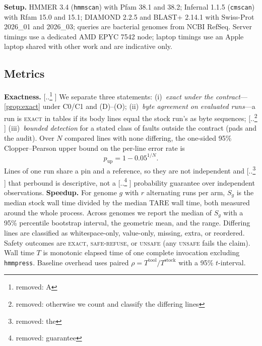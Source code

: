 \documentclass[letterpaper,twocolumn,10pt]{article}
\theoremstyle{definition}
\newcommand{\sys}{TARE\xspace}
\newcommand{\sys}{PARE\xspace}
\newcommand{\dec}[1]{\textsc{#1}}
\providecommand{\DIFadd}[1]{{\protect\color{blue} \sf #1}} %
\providecommand{\DIFdel}[1]{{\protect\color{red} [..\footnote{removed: #1} ]}} %
\providecommand{\DIFaddbegin}{} %
\providecommand{\DIFaddend}{} %
\providecommand{\DIFdelbegin}{} %
\providecommand{\DIFdelend}{} %
\providecommand{\DIFscaledelfig}{0.5}
\newlength{\DIFdelgraphicswidth} %
\newlength{\DIFdelgraphicsheight} %
\providecommand{\DIFaddincludegraphics}[2][]{{\color{blue}\fbox{\DIFOincludegraphics[#1]{#2}}}} %
\providecommand{\DIFdelincludegraphics}[2][]{%
\sbox{\DIFdelgraphicsbox}{\DIFOincludegraphics[#1]{#2}}%
\settoboxwidth{\DIFdelgraphicswidth}{\DIFdelgraphicsbox} %
\settoboxtotalheight{\DIFdelgraphicsheight}{\DIFdelgraphicsbox} %
\scalebox{\DIFscaledelfig}{%
\parbox[b]{\DIFdelgraphicswidth}{\usebox{\DIFdelgraphicsbox}\\[-\baselineskip] \rule{\DIFdelgraphicswidth}{0em}}\llap{\resizebox{\DIFdelgraphicswidth}{\DIFdelgraphicsheight}{%
\setlength{\unitlength}{\DIFdelgraphicswidth}%
\begin{picture}(1,1)%
\thicklines\linethickness{2pt} %
{\color[rgb]{1,0,0}\put(0,0){\framebox(1,1){}}}%
{\color[rgb]{1,0,0}\put(0,0){\line( 1,1){1}}}%
{\color[rgb]{1,0,0}\put(0,1){\line(1,-1){1}}}%
\end{picture}%
}\hspace*{3pt}}} %
} %
\DeclareRobustCommand{\DIFaddbegin}{\DIFOaddbegin \let\includegraphics\DIFaddincludegraphics} %
\DeclareRobustCommand{\DIFaddend}{\DIFOaddend \let\includegraphics\DIFOincludegraphics} %
\DeclareRobustCommand{\DIFdelbegin}{\DIFOdelbegin \let\includegraphics\DIFdelincludegraphics} %
\DeclareRobustCommand{\DIFdelend}{\DIFOaddend \let\includegraphics\DIFOincludegraphics} %
\begin{document}
\textbf{Setup.} HMMER 3.4 (\texttt{hmmscan}) with Pfam 38.1 and 38.2; Infernal 1.1.5 (\texttt{cmscan}) with Rfam 15.0
and 15.1; DIAMOND 2.2.5 and BLAST+ 2.14.1 with Swiss\nobreakdash-Prot 2026\_01 and 2026\_03; queries are bacterial genomes from NCBI
RefSeq. Server timings use a dedicated AMD EPYC 7542 node; laptop timings use an Apple laptop shared with other work and
are indicative only.

\subsection{Metrics}
\label{sec:metrics}

\textbf{Exactness.} \DIFdelbegin \DIFdel{A }\DIFdelend \DIFaddbegin \DIFadd{We separate three statements: (i)~\emph{exact under the contract}---\cref{prop:exact} under C0/C1 and
(D)--(O); (ii)~\emph{byte agreement on evaluated runs}---a }\DIFaddend run is \dec{exact} \DIFaddbegin \DIFadd{in tables }\DIFaddend if its body lines equal the stock
run's as byte sequences; \DIFdelbegin \DIFdel{otherwise we count
and classify the
differing lines}\DIFdelend \DIFaddbegin \DIFadd{(iii)~\emph{bounded detection} for a stated class of faults outside the contract (pads and the
audit)}\DIFaddend . Over $N$ compared lines with none differing, the one\nobreakdash-sided 95\% Clopper--Pearson upper
bound on the per\nobreakdash-line error rate is
\begin{equation}
p_{\text{up}} = 1 - 0.05^{1/N}.
\label{eq:cp}
\end{equation}
Lines of one run share a pin and a reference, so they are not independent and \DIFdelbegin \DIFdel{the }\DIFdelend \DIFaddbegin \DIFadd{that per}\nobreakdash\DIFadd{-line }\DIFaddend bound is descriptive, not a
\DIFdelbegin \DIFdel{guarantee}\DIFdelend \DIFaddbegin \DIFadd{probability guarantee over independent observations}\DIFaddend .
\textbf{Speedup.} For genome $g$ with $r$ alternating runs per arm, $S_g$ is the median stock wall time divided by the
median \sys wall time, both measured around the whole process. Across genomes we report the median of $S_g$ with a 95\%
percentile bootstrap interval, the geometric mean, and the range. Differing lines are classified as whitespace\nobreakdash-only,
value\nobreakdash-only, missing, extra, or reordered. Safety outcomes are \dec{exact}, \dec{safe-refuse}, or \dec{unsafe}
(any \dec{unsafe} fails the claim). Wall time $T$ is monotonic elapsed time of one complete invocation excluding
\texttt{hmmpress}. Baseline overhead uses paired $\rho = T^{\text{tool}}/T^{\text{stock}}$ with a 95\% $t$-interval.
\end{document}
